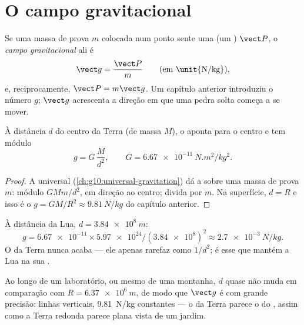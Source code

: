 \section{O campo gravitacional}

\begin{definition}\label{def:g11:electric-gravitational-fields:gfield}
Se uma massa de prova $m$ colocada num ponto sente uma  (um ) $\vect P$, o \emph{campo
gravitacional} ali é
\[
\vect g = \frac{\vect P}{m} \qquad \text{(em \unit{N/kg})},
\]
e, reciprocamente, $\vect P = m \vect g$. Um capítulo anterior
introduziu o número $g$; $\vect g$ acrescenta a direção em que uma pedra
solta começa a se mover.
\end{definition}

\begin{proposition}\label{prop:g11:electric-gravitational-fields:earth}
À distância $d$ do centro da Terra (de massa $M$), o 
aponta para o centro e tem módulo
\[
g = G\,\frac{M}{d^2},
\qquad G = \qty{6.67e-11}{N.m^2/kg^2}.
\]
\end{proposition}

\begin{proof}
A  universal (\cref{ch:g10:universal-gravitation}) dá a 
sobre uma massa de prova $m$: módulo $G M m / d^2$, em direção ao centro;
divida por $m$. Na superfície, $d = R$ e isso é o
$g = GM/R^2 \approx \qty{9.81}{N/kg}$ do capítulo anterior.
\end{proof}

\begin{example}\label{ex:g11:electric-gravitational-fields:moon}
À distância da Lua, $d = \qty{3.84e8}{m}$:
\[
g = \num{6.67e-11} \times \num{5.97e24} / (\num{3.84e8})^2
\approx \qty{2.7e-3}{N/kg}.
\]
O  da Terra nunca acaba --- ele apenas rarefaz como $1/d^2$; é esse
 que mantém a Lua na sua .
\end{example}

\begin{remark}\label{rem:g11:electric-gravitational-fields:uniformg}
Ao longo de um laboratório, ou mesmo de uma montanha, $d$ quase não muda
em comparação com $R = \qty{6.37e6}{m}$, de modo que $\vect g$ é 
com grande precisão: linhas verticais, \qty{9.81}{N/kg} constantes --- o
 da Terra parece o do , assim como a Terra redonda parece
plana vista de um jardim.
\end{remark}

